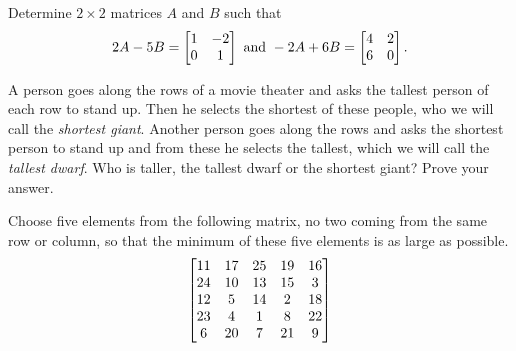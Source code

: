 \begin{pro}
Determine $2\times 2$ matrices $A$ and $B$ such that
$$2A - 5B = \begin{bmatrix} 1 & -2 \cr 0 & 1 \cr \end{bmatrix} \mbox{ and } -2A + 6B = \begin{bmatrix} 4 & 2 \cr 6 & 0 \cr\end{bmatrix}.   $$
\end{pro}


\begin{pro}
A person goes along the rows of a movie theater and asks the
tallest person of each row to stand up. Then he selects the
shortest of these people, who we will call the {\em shortest
giant}. Another person goes along the rows and asks the shortest
person to stand up and from these he selects the tallest, which we
will call the {\em tallest dwarf}. Who is taller, the tallest
dwarf or the shortest giant? Prove your answer.
\end{pro}

\begin{pro}
Choose five elements from the following matrix, 
no two coming from the same row or column, so that
the minimum of these five elements is as large as possible.
$$\begin{bmatrix}11 & 17 & 25
& 19 & 16 \cr 24 & 10 & 13 & 15 & 3 \cr 12 & 5 & 14 & 2 & 18 \cr
23 & 4 & 1 & 8 & 22 \cr 6 & 20 & 7 & 21 & 9
\end{bmatrix}$$ 
\end{pro}

